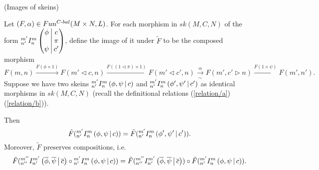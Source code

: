 \begin{lemma} (Images of skeins) \label{lemma/image-of-skein}

  \noindent
  Let $(F,\alpha) \in Fun^{C{\text -}bal}(M \times N, L)$. For each morphism
  in $sk(M,C,N)$ of the form ${}^{m'}_{n'} I^{m}_{n} \left( \begin{matrix} \phi \\ {}\\ \psi \end{matrix} \,\middle|\, \begin{matrix} c \\ \pi \\ c' \end{matrix} \right)$,
  define the image of it under $\tilde{F}$ to be the composed morphism
  \[
    F(m,n)
    \xrightarrow{F(\phi \times 1)}
    F(m' \lhd c, n)
    \xrightarrow{F((1 \lhd \pi) \times 1)}
    F(m' \lhd c', n)
    \xrightarrow[\sim]{\alpha}
    F(m', c' \rhd n)
    \xrightarrow{F(1 \times \psi)}
    F(m',n').
  \]
  Suppose we have two skeins ${}^{m'}_{n'} I^{m}_{n} \left( \phi, \psi \,\middle|\, c \right)$ and
  $ {}^{m'}_{n'} I^{m}_{n} \left( \phi', \psi' \,\middle|\, c' \right)$ as identical morphisms in $sk(M,C,N)$
  (recall the definitional relations (\ref{relation/a}) (\ref{relation/b})).

  \noindent Then
  \begin{equation} \label{eqn/a}
    \tilde{F}({}^{m'}_{n'} I^{m}_{n} \left( \phi, \psi \,\middle|\, c \right)) = \tilde{F}({}^{m'}_{n'} I^{m}_{n} \left( \phi', \psi' \,\middle|\, c' \right)).
  \end{equation}
  Moreover, $\tilde{F}$ preserves compositions, i.e.
  \begin{equation} \label{eqn/b}
    \tilde{F}({}^{m''}_{n''} I^{m'}_{n'} \left( \overline{\phi}, \overline{\psi} \,\middle|\, \overline{c} \right) \circ {}^{m'}_{n'} I^{m}_{n} \left( \phi, \psi \,\middle|\, c \right))
    = \tilde{F}({}^{m''}_{n''} I^{m'}_{n'} \left( \overline{\phi}, \overline{\psi} \,\middle|\, \overline{c} \right))
    \circ
    \tilde{F}({}^{m'}_{n'} I^{m}_{n} \left( \phi, \psi \,\middle|\, c \right)).
  \end{equation}
\end{lemma}

